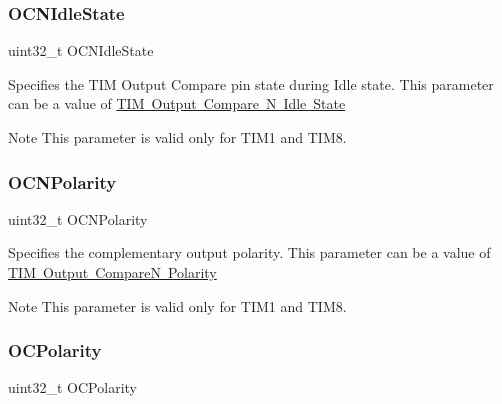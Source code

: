 \subsubsection{\texorpdfstring{O\+C\+N\+Idle\+State}{OCNIdleState}}
{\footnotesize\ttfamily uint32\+\_\+t O\+C\+N\+Idle\+State}

Specifies the T\+IM Output Compare pin state during Idle state. This parameter can be a value of \mbox{\hyperlink{group___t_i_m___output___compare___n___idle___state}{T\+IM Output Compare N Idle State}} \begin{DoxyNote}{Note}
This parameter is valid only for T\+I\+M1 and T\+I\+M8. 
\end{DoxyNote}
\mbox{\label{struct_t_i_m___one_pulse___init_type_def_a978da9dd7cda80eb5fe8d04828b9bbcc}} 
\subsubsection{\texorpdfstring{O\+C\+N\+Polarity}{OCNPolarity}}
{\footnotesize\ttfamily uint32\+\_\+t O\+C\+N\+Polarity}

Specifies the complementary output polarity. This parameter can be a value of \mbox{\hyperlink{group___t_i_m___output___compare___n___polarity}{T\+IM Output CompareN Polarity}} \begin{DoxyNote}{Note}
This parameter is valid only for T\+I\+M1 and T\+I\+M8. 
\end{DoxyNote}
\mbox{\label{struct_t_i_m___one_pulse___init_type_def_a781c7dae9dec8b6c974b1bdf591b77e7}} 
\subsubsection{\texorpdfstring{O\+C\+Polarity}{OCPolarity}}
{\footnotesize\ttfamily uint32\+\_\+t O\+C\+Polarity}

